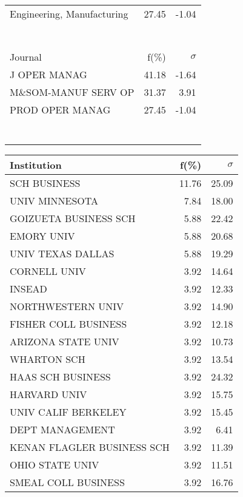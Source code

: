 \documentclass[a4paper,11pt]{report}
\begin{document}
\begin{landscape}
\begin{table}[!ht]
{\begin{tabular}{|l r  r|}
Engineering, Manufacturing & 27.45 & -1.04\\
 &  & \\
 &  & \\
 &  & \\
 &  & \\
 &  & \\
 &  & \\
 &  & \\
\hline
\hline
Journal & f(\%) & $\sigma$\\
\hline
J OPER MANAG & 41.18 & -1.64\\
M\&SOM-MANUF SERV OP & 31.37 & 3.91\\
PROD OPER MANAG & 27.45 & -1.04\\
 &  & \\
 &  & \\
 &  & \\
 &  & \\
 &  & \\
 &  & \\
 &  & \\
\hline
\end{tabular}
}
{\scriptsize\begin{tabular}{|l r r|}
\hline
Institution & f(\%) & $\sigma$\\
\hline
SCH BUSINESS & 11.76 & 25.09\\
UNIV MINNESOTA & 7.84 & 18.00\\
GOIZUETA BUSINESS SCH & 5.88 & 22.42\\
EMORY UNIV & 5.88 & 20.68\\
UNIV TEXAS DALLAS & 5.88 & 19.29\\
CORNELL UNIV & 3.92 & 14.64\\
INSEAD & 3.92 & 12.33\\
NORTHWESTERN UNIV & 3.92 & 14.90\\
FISHER COLL BUSINESS & 3.92 & 12.18\\
ARIZONA STATE UNIV & 3.92 & 10.73\\
WHARTON SCH & 3.92 & 13.54\\
HAAS SCH BUSINESS & 3.92 & 24.32\\
HARVARD UNIV & 3.92 & 15.75\\
UNIV CALIF BERKELEY & 3.92 & 15.45\\
DEPT MANAGEMENT & 3.92 & 6.41\\
KENAN FLAGLER BUSINESS SCH & 3.92 & 11.39\\
OHIO STATE UNIV & 3.92 & 11.51\\
SMEAL COLL BUSINESS & 3.92 & 16.76\\

\end{tabular}}
\end{table}
\end{landscape}
\end{document}
